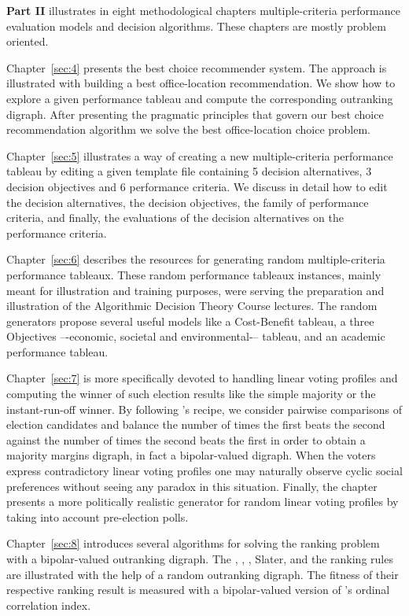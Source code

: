 \textbf{Part II} illustrates in eight methodological chapters multiple-criteria performance evaluation models and decision algorithms. These chapters are mostly problem oriented.

Chapter~\ref{sec:4} presents the \Rubis best choice recommender system. The approach is illustrated with building a best office-location recommendation. We show how to explore a given performance tableau and compute the corresponding outranking digraph. After presenting the pragmatic principles that govern our best choice recommendation algorithm we solve the best office-location choice problem.

Chapter~\ref{sec:5} illustrates a way of creating a new multiple-criteria performance tableau by editing a given template file containing 5 decision alternatives, 3 decision objectives and 6 performance criteria. We discuss in detail how to edit the decision alternatives, the decision objectives, the family of performance criteria, and finally, the evaluations of the decision alternatives on the performance criteria.

Chapter~\ref{sec:6} describes the \Digraph resources for generating random multiple-criteria performance tableaux. These random performance tableaux instances, mainly meant for illustration and training purposes, were serving the preparation and illustration of the Algorithmic Decision Theory Course lectures. The random generators propose several useful models like a Cost-Benefit tableau, a three Objectives –-economic, societal and environmental-– tableau, and an academic performance tableau.

Chapter~\ref{sec:7} is more specifically devoted to handling linear voting profiles and computing the winner of such election results like the simple majority or the instant-run-off winner. By following \Condorcet 's recipe, we consider pairwise comparisons of election candidates and balance the number of times the first beats the second against the number of times the second beats the first in order to obtain a majority margins digraph, in fact a bipolar-valued digraph. When the voters express contradictory linear voting profiles one may naturally observe cyclic social preferences without seeing any paradox in this situation. Finally, the chapter presents a more politically realistic generator for random linear voting profiles by taking into account pre-election polls.

Chapter~\ref{sec:8} introduces several algorithms for solving the ranking problem with a bipolar-valued outranking digraph. The \Copeland, \NetFlows, \Kemeny, {\sc Sla\-ter}, \Kohler and the \RankedPairs ranking rules are illustrated with the help of a random outranking digraph. The fitness of their respective ranking result is measured with a bipolar-valued version of \Kendall 's ordinal correlation index.

